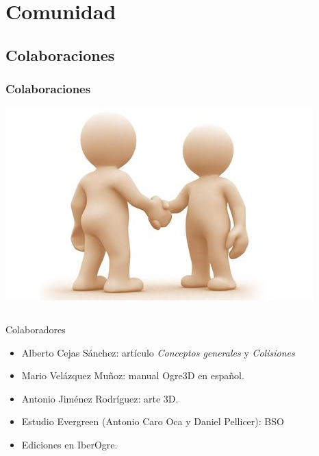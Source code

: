 \documentclass[green]{beamer}
\begin{document}
\section{Comunidad}

\subsection{Colaboraciones}


\begin{frame}
\transdissolve
    \frametitle{Colaboraciones}
    
    \begin{center}
	\includegraphics[scale=0.10]{img/colaboradores.jpg}
    \end{center}
    
    \begin{columns}[t]
    \column{150pt}
        
	\tiny{
	\begin{block}{Colaboradores}
            \begin{itemize}
                \item Alberto Cejas Sánchez: artículo \emph{Conceptos generales} y \emph{Colisiones}
		\item Mario Velázquez Muñoz: manual Ogre3D en español.
		\item Antonio Jiménez Rodríguez: arte 3D.
		\item Estudio Evergreen (Antonio Caro Oca y Daniel Pellicer): BSO
		\item Ediciones en IberOgre.
            \end{itemize}            
        \end{block}
	}


\end{columns}
\end{frame}
\end{document}
